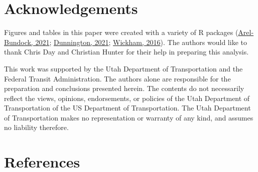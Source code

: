 \documentclass[3p, authoryear, review]{elsarticle} %
\begin{document}
\hypertarget{acks}{%
\section*{Acknowledgements}\label{acks}}

Figures and tables in this paper were created with a variety of R
packages (\protect\hyperlink{ref-R-modelsummary}{Arel-Bundock, 2021}; \protect\hyperlink{ref-R-ggspatial}{Dunnington, 2021}; \protect\hyperlink{ref-ggplot22016}{Wickham, 2016}). The authors would like to thank
Chris Day and Christian Hunter for their help in preparing this analysis.

This work was supported by the Utah Department of Transportation and the
Federal Transit Administration. The authors alone are responsible for the
preparation and conclusions presented herein. The contents do not necessarily
reflect the views, opinions, endorsements, or policies of the Utah Department of
Transportation of the US Department of Transportation. The Utah Department of
Transportation makes no representation or warranty of any kind, and assumes no
liability therefore.

\hypertarget{references}{%
\section*{References}\label{references}}
\end{document}
